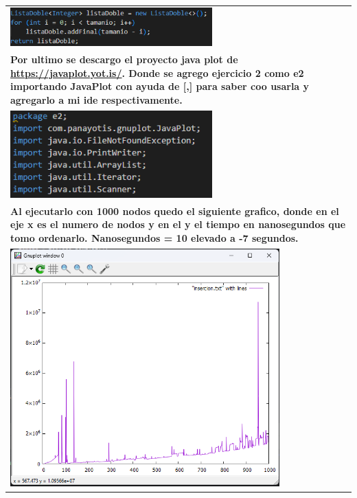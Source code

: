 \documentclass[9pt]{article}
\begin{document}
\begin{longtable}{|p{15cm}|}
			\includegraphics[width=0.6\textwidth,keepaspectratio]{img/generador.png}\\
			\textbf{Por ultimo se descargo el proyecto java plot de \url{https://javaplot.yot.is/}.
			Donde se agrego ejercicio 2 como e2 importando JavaPlot con ayuda de [,] para
			saber coo usarla y agregarlo a mi ide respectivamente.}\\
			\includegraphics[width=0.6\textwidth,keepaspectratio]{img/importaciones.png}\\
			\textbf{Al ejecutarlo con 1000 nodos quedo el siguiente grafico, donde en el
			eje x es el numero de nodos y en el y el tiempo en nanosegundos que tomo ordenarlo.
			Nanosegundos = 10 elevado a -7 segundos.}\\
			\includegraphics[width=0.8\textwidth,keepaspectratio]{img/plot.png}\\
			\hline
	\end{longtable}
\end{document}

